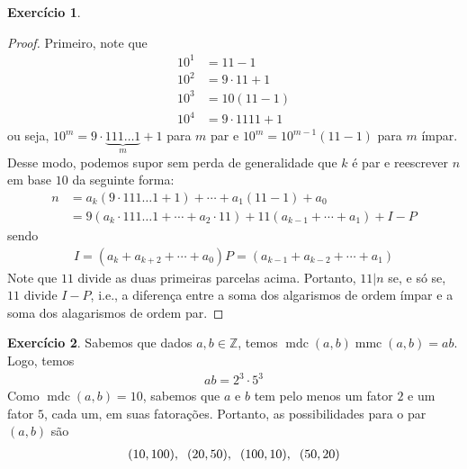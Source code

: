 \documentclass[a4paper,12pt]{article}
\DeclareMathOperator{\mdc}{mdc}
\DeclareMathOperator{\mmc}{mmc}
\theoremstyle{definition}
\newtheorem{exercise}{Exercício}%
\begin{document}
	\begin{exercise}
		\begin{proof}
		Primeiro, note que 
		\begin{align*}
		10^1 &= 11 - 1 \\
		10^2 &= 9\cdot 11 + 1 \\
		10^3 &= 10(11 - 1) \\
		10^4 &= 9\cdot 1111 + 1
		\end{align*}
		ou seja, $10^m = 9\cdot \underbrace{111\dots 1}_{m} + 1$ para $m$ par e $10^m = 10^{m-1}(11-1)$ para $m$ ímpar. Desse modo, podemos supor sem perda de generalidade que $k$ é par e reescrever $n$ em base $10$ da seguinte forma:
		\begin{align*}
		n &= a_k(9\cdot 111\dots 1 + 1) + \cdots + a_1(11 - 1) + a_0 \\
		&= 9(a_k\cdot 111\dots 1 + \cdots + a_2\cdot 11) + 11(a_{k-1} + \cdots + a_1) + I  - P 
		\end{align*}
		sendo
		\begin{align*}
		I = (a_k + a_{k+2} + \cdots + a_0)
		P = (a_{k-1} + a_{k-2} + \cdots + a_1)
		\end{align*}
		Note que $11$ divide as duas primeiras parcelas acima. Portanto, $11|n$ se, e só se, $11$ divide $I - P$, i.e., a diferença entre a soma dos algarismos de ordem ímpar e a soma dos alagarismos de ordem par.
	\end{proof}
	\end{exercise}
	\begin{exercise}
		Sabemos que dados $a,b\in\mathbb{Z}$, temos $\mdc(a,b)\mmc(a,b) = ab$. Logo, temos
		\begin{align*}
		ab = 2^3\cdot 5^3
		\end{align*}
		Como $\mdc(a,b) = 10$, sabemos que $a$ e $b$ tem pelo menos um fator $2$ e um fator $5$, cada um, em suas fatorações. Portanto, as possibilidades para o par $(a,b)$ são
		\begin{align*}
		(10,100), \hspace{0.2cm} (20,50), \hspace{0.2cm} (100,10), \hspace{0.2cm} (50,20)
		\end{align*}
	\end{exercise}
\end{document}
